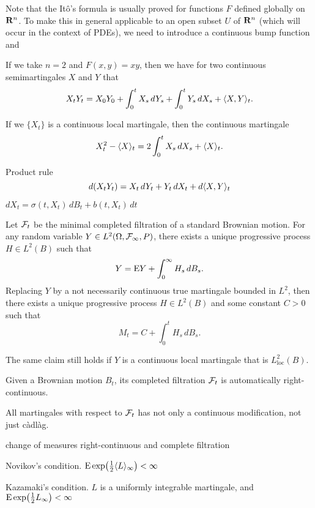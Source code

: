 \documentclass[10pt]{book}
\begin{document}
Note that the Itô's formula is usually proved for functions $F$ defined globally on $\mathbf{R}^n$. To make this in general applicable to an open subset $U$ of $\mathbf{R}^n$ (which will occur in the context of PDEs), we need to introduce a continuous bump function and 

\begin{cor}
    If we take $n = 2$ and $F(x,y) = xy$, then we have for two continuous semimartingales $X$ and $Y$ that \[
        X_tY_t = X_0Y_0 + \int_0^t X_s \,dY_s + \int_0^t Y_s \,dX_s + \langle X, Y \rangle_t.
    \]
\end{cor}

If we $\{X_t\}$ is a continuous local martingale, then the continuous martingale \[
        X_t^2 - \langle X \rangle_t = 2\int_0^t X_s\,dX_s + \langle X \rangle_t.
    \]

Product rule
\[
    d(X_tY_t) = X_t\,dY_t + Y_t\,dX_t + d\langle X, Y \rangle_t
\]

$dX_t = \sigma(t,X_t)\,dB_t + b(t,X_t)\,dt$

\begin{namedthm}
    Let $\mathcal{F}_t$ be the minimal completed filtration of a standard Brownian motion. For any random variable $Y \in L^2(\Omega, \mathcal{F}_\infty, P)$, there exists a unique progressive process $H \in L^2(B)$ such that \[
        Y = \mathop{}\!\mathrm{E} Y + \int_0^\infty H_s\,dB_s.
    \] Replacing $Y$ by a not necessarily continuous true martingale bounded in $L^2$, then there exists a unique progressive process $H \in L^2(B)$ and some constant $C > 0$ such that \[
        M_t = C + \int_0^t H_s \,dB_s.
    \]

    The same claim still holds if $Y$ is a continuous local martingale that is $L^2_\mathrm{loc}(B)$.
\end{namedthm}

Given a Brownian motion $B_t$, its completed filtration $\mathcal{F}_t$ is automatically right-continuous.

All martingales with respect to $\mathcal{F}_t$ has not only a continuous modification, not just càdlàg.

change of measures right-continuous and complete filtration

\begin{namedthm}
    
\end{namedthm}

Novikov's condition. $\mathop{}\!\mathrm{E} \exp \bigl(\frac{1}{2}\langle L \rangle_\infty\bigr) < \infty$

Kazamaki's condition. $L$ is a uniformly integrable martingale, and $\mathop{}\!\mathrm{E} \exp\bigl(\frac{1}{2} L_\infty \bigr) < \infty$
\end{document}
